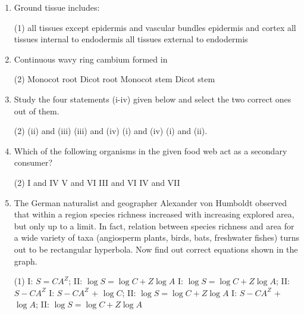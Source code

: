 \documentclass[twocolumn]{article}
\begin{document}
\begin{enumerate}
    \item Ground tissue includes:
    \begin{tasks}(1)
        \task all tissues except epidermis and vascular bundles
        \task epidermis and cortex
        \task all tissues internal to endodermis
        \task all tissues external to endodermis
    \end{tasks}
    
    \item Continuous wavy ring cambium formed in
    \begin{tasks}(2)
        \task Monocot root
        \task Dicot root
        \task Monocot stem
        \task Dicot stem
    \end{tasks}
    
    \item Study the four statements (i-iv) given below and select the two correct ones out of them.
    \begin{tasks}(2)
        \task (ii) and (iii)
        \task (iii) and (iv)
        \task (i) and (iv)
        \task (i) and (ii).
    \end{tasks}

    \item Which of the following organisms in the given food web act as a secondary consumer?
    \begin{center}
    \end{center}
    \begin{tasks}(2)
        \task I and IV
        \task V and VI
        \task III and VI
        \task IV and VII
    \end{tasks}

    \item The German naturalist and geographer Alexander von Humboldt observed that within a region species richness increased with increasing explored area, but only up to a limit. In fact, relation between species richness and area for a wide variety of taxa (angiosperm plants, birds, bats, freshwater fishes) turns out to be rectangular hyperbola. Now find out correct equations shown in the graph.
    \begin{center}
    \end{center}
    \begin{tasks}(1)
        \task I: \( S = CA^{Z} \); II: \( \log S = \log C + Z \log A \)
        \task I: \( \log S = \log C + Z \log A \); II: \( S - CA^{Z} \)
        \task I: \( S - CA^{Z} \) + \( \log C \); II: \( \log S = \log C + Z \log A \)
        \task I: \( S - CA^{Z} \) + \( \log A \); II: \( \log S = \log C + Z \log A \)
    \end{tasks}


\end{enumerate}
\end{document}
